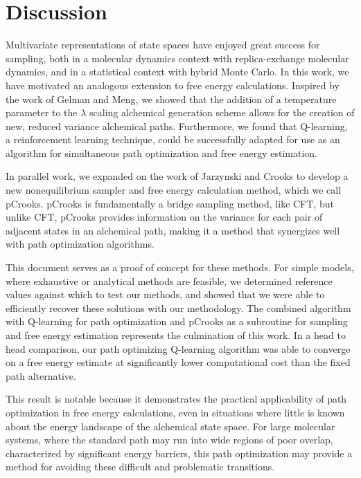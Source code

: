 
\chapter{Discussion}

Multivariate representations of state spaces have enjoyed great success for sampling, both in a molecular dynamics context with replica-exchange molecular dynamics\cite{sugita2000multidimensional}, and in a statistical context with hybrid Monte Carlo\cite{duane1987hybrid}.
In this work, we have motivated an analogous extension to free energy calculations.
Inspired by the work of Gelman and Meng\cite{gelman1998simulating}, we showed that the addition of a temperature parameter to the $\lambda$ scaling alchemical generation scheme allows for the creation of new, reduced variance alchemical paths.
Furthermore, we found that Q-learning\cite{watkins1992q}, a reinforcement learning technique, could be successfully adapted for use as an algorithm for simultaneous path optimization and free energy estimation.

In parallel work, we expanded on the work of Jarzynski\cite{jarzynski1997nonequilibrium1} and Crooks\cite{crooks2000path} to develop a new nonequilibrium sampler and free energy calculation method, which we call pCrooks. 
pCrooks is fundamentally a bridge sampling method, like CFT, but unlike CFT, pCrooks provides information on the variance for each pair of adjacent states in an alchemical path, making it a method that synergizes well with path optimization algorithms. 

This document serves as a proof of concept for these methods.
For simple models, where exhaustive or analytical methods are feasible, we determined reference values against which to test our methods, and showed that we were able to efficiently recover these solutions with our methodology.
The combined algorithm with Q-learning for path optimization and pCrooks as a subroutine for sampling and free energy estimation represents the culmination of this work.
In a head to head comparison, our path optimizing Q-learning algorithm was able to converge on a free energy estimate at significantly lower computational cost than the fixed path alternative.

This result is notable because it demonstrates the practical applicability of path optimization in free energy calculations, even in situations where little is known about the energy landscape of the alchemical state space.
For large molecular systems, where the standard path may run into wide regions of poor overlap, characterized by significant energy barriers, this path optimization may provide a method for avoiding these difficult and problematic transitions.


